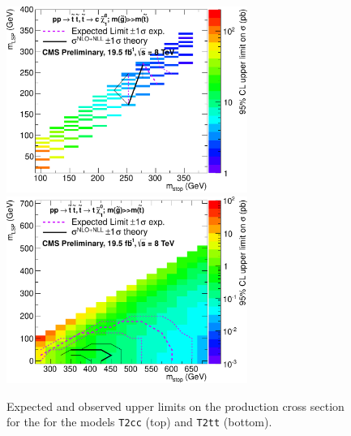 \begin{figure}[h!]
  \begin{center}
      \includegraphics[width=0.70\textwidth,clip=true]{figures/limits/merged/T2cc/v2/CLs_frequentist_T2cc_2012pf_0b_le3j_0b_ge4j_1b_ge4j_xsLimit}\\
      \includegraphics[width=0.70\textwidth,clip=true]{figures/limits/merged/T2tt/v6/CLs_frequentist_T2tt_2012pf_1b_ge4j_2b_ge4j_xsLimit.pdf}
    \caption{\label{fig:upperLimit-t2tt-obs-400} Expected 
    and observed upper limits on the production cross section 
    for the for the models \texttt{T2cc} (top) and \texttt{T2tt} (bottom). }
  \end{center}
\end{figure}

